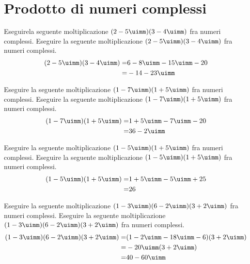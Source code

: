  \section{Prodotto di numeri complessi}
\begin{exercise}
	Eseguirela seguente moltiplicazione $(2-5\uimm)(3-4\uimm)$ fra numeri complessi.
	\tcblower
	Eseguire la seguente moltiplicazione $(2-5\uimm)(3-4\uimm)$ fra numeri complessi.
	\begin{align*}
	(2-5\uimm)(3-4\uimm)=&6-8\uimm-15\uimm-20\\
	=&-14-23\uimm
	\end{align*}
\end{exercise}
\begin{exercise}
	Eseguire la seguente moltiplicazione $(1-7\uimm)(1+5\uimm)$ fra numeri complessi.
	\tcblower
	Eseguire la seguente moltiplicazione $(1-7\uimm)(1+5\uimm)$ fra numeri complessi.
	\begin{align*}
	(1-7\uimm)(1+5\uimm)=&1+5\uimm-7\uimm-20\\
	=&36-2\uimm
	\end{align*}
\end{exercise}
\begin{exercise}
	Eseguire la seguente moltiplicazione $(1-5\uimm)(1+5\uimm) $ fra numeri complessi.
	\tcblower
	Eseguire la seguente moltiplicazione $(1-5\uimm)(1+5\uimm)$ fra numeri complessi.
	\begin{align*}
	(1-5\uimm)(1+5\uimm)=&1+5\uimm-5\uimm+25\\
	=&26
	\end{align*}
\end{exercise}
\begin{exercise}
	Eseguire la seguente moltiplicazione $(1-3\uimm)(6-2\uimm)(3+2\uimm)$ fra numeri complessi.
	\tcblower
	Eseguire la seguente moltiplicazione $(1-3\uimm)(6-2\uimm)(3+2\uimm)$ fra numeri complessi.
	\begin{align*}
	(1-3\uimm)(6-2\uimm)(3+2\uimm)=&(1-2\uimm-18\uimm-6)(3+2\uimm)\\
	=&-20\uimm(3+2\uimm)\\
	=&40-60\uimm\\
	\end{align*}
\end{exercise}


